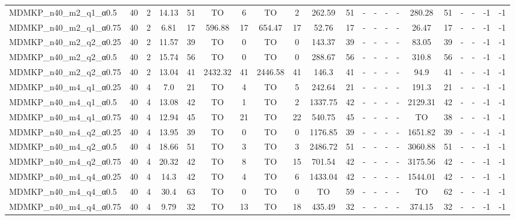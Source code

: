 \begin{sidewaystable}[!ht]
{\begin{tabular}{lcccccccccccccccccccc}
MDMKP\_n40\_m2\_q1\_α0.5 & 40 & 2 &  \textcolor{blue2}{14.13} & 51 & TO & 6 & TO & 2 & 262.59 & 51 &  - &  - &  - &  - & 280.28 & 51 &  - &  - & -1 & -1 \\
MDMKP\_n40\_m2\_q1\_α0.75 & 40 & 2 &  \textcolor{blue2}{6.81} & 17 & 596.88 & 17 & 654.47 & 17 & 52.76 & 17 &  - &  - &  - &  - & 26.47 & 17 &  - &  - & -1 & -1 \\
MDMKP\_n40\_m2\_q2\_α0.25 & 40 & 2 &  \textcolor{blue2}{11.57} & 39 & TO & 0 & TO & 0 & 143.37 & 39 &  - &  - &  - &  - & 83.05 & 39 &  - &  - & -1 & -1 \\
MDMKP\_n40\_m2\_q2\_α0.5 & 40 & 2 &  \textcolor{blue2}{15.74} & 56 & TO & 0 & TO & 0 & 288.67 & 56 &  - &  - &  - &  - & 310.8 & 56 &  - &  - & -1 & -1 \\
MDMKP\_n40\_m2\_q2\_α0.75 & 40 & 2 &  \textcolor{blue2}{13.04} & 41 & 2432.32 & 41 & 2446.58 & 41 & 146.3 & 41 &  - &  - &  - &  - & 94.9 & 41 &  - &  - & -1 & -1 \\
MDMKP\_n40\_m4\_q1\_α0.25 & 40 & 4 &  \textcolor{blue2}{7.0} & 21 & TO & 4 & TO & 5 & 242.64 & 21 &  - &  - &  - &  - & 191.3 & 21 &  - &  - & -1 & -1 \\
MDMKP\_n40\_m4\_q1\_α0.5 & 40 & 4 &  \textcolor{blue2}{13.08} & 42 & TO & 1 & TO & 2 & 1337.75 & 42 &  - &  - &  - &  - & 2129.31 & 42 &  - &  - & -1 & -1 \\
MDMKP\_n40\_m4\_q1\_α0.75 & 40 & 4 &  \textcolor{blue2}{12.94} & 45 & TO & 21 & TO & 22 & 540.75 & 45 &  - &  - &  - &  - & TO & 38 &  - &  - & -1 & -1 \\
MDMKP\_n40\_m4\_q2\_α0.25 & 40 & 4 &  \textcolor{blue2}{13.95} & 39 & TO & 0 & TO & 0 & 1176.85 & 39 &  - &  - &  - &  - & 1651.82 & 39 &  - &  - & -1 & -1 \\
MDMKP\_n40\_m4\_q2\_α0.5 & 40 & 4 &  \textcolor{blue2}{18.66} & 51 & TO & 3 & TO & 3 & 2486.72 & 51 &  - &  - &  - &  - & 3060.88 & 51 &  - &  - & -1 & -1 \\
MDMKP\_n40\_m4\_q2\_α0.75 & 40 & 4 &  \textcolor{blue2}{20.32} & 42 & TO & 8 & TO & 15 & 701.54 & 42 &  - &  - &  - &  - & 3175.56 & 42 &  - &  - & -1 & -1 \\
MDMKP\_n40\_m4\_q4\_α0.25 & 40 & 4 &  \textcolor{blue2}{14.3} & 42 & TO & 4 & TO & 6 & 1433.04 & 42 &  - &  - &  - &  - & 1544.01 & 42 &  - &  - & -1 & -1 \\
MDMKP\_n40\_m4\_q4\_α0.5 & 40 & 4 &  \textcolor{blue2}{30.4} & 63 & TO & 0 & TO & 0 & TO & 59 &  - &  - &  - &  - & TO & 62 &  - &  - & -1 & -1 \\
MDMKP\_n40\_m4\_q4\_α0.75 & 40 & 4 &  \textcolor{blue2}{9.79} & 32 & TO & 13 & TO & 18 & 435.49 & 32 &  - &  - &  - &  - & 374.15 & 32 &  - &  - & -1 & -1 \\

\end{tabular}}
\end{sidewaystable}
